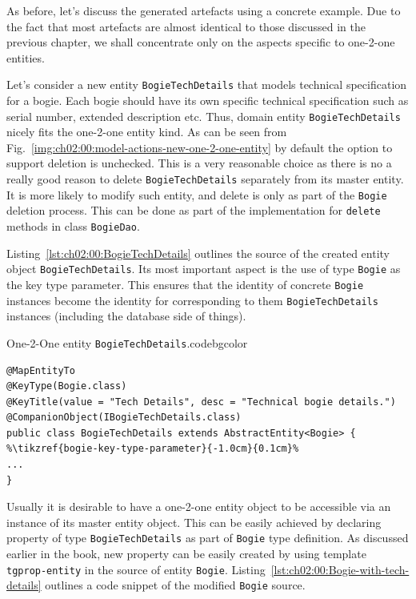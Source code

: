   As before, let's discuss the generated artefacts using a concrete example.
  Due to the fact that most artefacts are almost identical to those discussed in the previous chapter, we shall concentrate only on the aspects specific to one-2-one entities.
  
  Let's consider a new entity \texttt{BogieTechDetails} that models technical specification for a bogie.
  Each bogie should have its own specific technical specification such as serial number, extended description etc.
  Thus, domain entity \texttt{BogieTechDetails} nicely fits the one-2-one entity kind.
  As can be seen from Fig.~\ref{img:ch02:00:model-actions-new-one-2-one-entity} by default the option to support deletion is unchecked.
  This is a very reasonable choice as there is no a really good reason to delete \texttt{BogieTechDetails} separately from its master entity.
  It is more likely to modify such entity, and delete is only as part of the \texttt{Bogie} deletion process.
  This can be done as part of the implementation for \texttt{delete} methods in class \texttt{BogieDao}.
  
  Listing~\ref{lst:ch02:00:BogieTechDetails} outlines the source of the created entity object \texttt{BogieTechDetails}.
  Its most important aspect is the use of type \texttt{Bogie} as the key type parameter.
  This ensures that the identity of concrete \texttt{Bogie} instances become the identity for corresponding to them \texttt{BogieTechDetails} instances (including the database side of things).

  \begin{code}{One-2-One entity \texttt{BogieTechDetails}.}{\label{lst:ch02:00:BogieTechDetails}}{codebgcolor}
  \begin{lstlisting}
@MapEntityTo
@KeyType(Bogie.class)
@KeyTitle(value = "Tech Details", desc = "Technical bogie details.")
@CompanionObject(IBogieTechDetails.class)
public class BogieTechDetails extends AbstractEntity<Bogie> { %\tikzref{bogie-key-type-parameter}{-1.0cm}{0.1cm}%
...    
}    
  \end{lstlisting}
  \vspace*{-7px}  
  \end{code}      
  
  Usually it is desirable to have a one-2-one entity object to be accessible via an instance of its master entity object.
  This can be easily achieved by declaring property of type \texttt{BogieTechDetails} as part of \texttt{Bogie} type definition.
  As discussed earlier in the book, new property can be easily created by using template \texttt{tgprop-entity} in the source of entity \texttt{Bogie}.
  Listing~\ref{lst:ch02:00:Bogie-with-tech-details} outlines a code snippet of the modified \texttt{Bogie} source.

